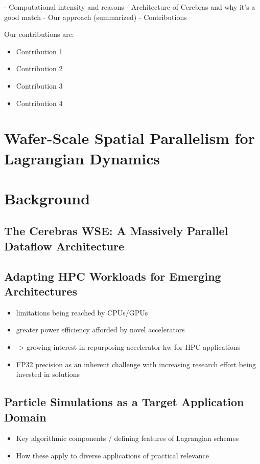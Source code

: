 \documentclass[review, anonymous, acmsmall]{acmart}
\begin{document}
- Computational intensity and reasons 
- Architecture of Cerebras and why it's a good match
- Our approach (summarized)
- Contributions

\noindent
Our contributions are:
\begin{itemize}
	\item Contribution 1
	\item Contribution 2
	\item Contribution 3
	\item Contribution 4
\end{itemize}

\section{Wafer-Scale Spatial Parallelism for Lagrangian Dynamics}

\section{Background}
\subsection{The Cerebras WSE: A Massively Parallel Dataflow Architecture}
\subsection{Adapting HPC Workloads for Emerging Architectures}
\begin{itemize}
  \item limitations being reached by CPUs/GPUs
  \item greater power efficiency afforded by novel accelerators
  \item -> growing interest in repurposing accelerator hw for HPC applications
  \item FP32 precision as an inherent challenge with increasing research effort being invested in solutions
\end{itemize}
\subsection{Particle Simulations as a Target Application Domain}
\begin{itemize}
  \item Key algorithmic components / defining features of Lagrangian schemes
  \item How these apply to diverse applications of practical relevance
\end{itemize}
\end{document}
